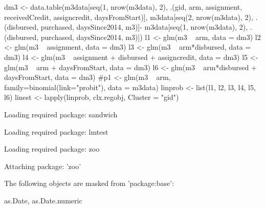 \begin{Schunk}
\begin{Sinput}
dm3 <- data.table(m3data[seq(1, nrow(m3data), 2), 
	.(gid, arm, assignment, receivedCredit, assigncredit, daysFromStart)],
	m3data[seq(2, nrow(m3data), 2), .(disbursed, purchased, daysSince2014, m3)]-
	m3data[seq(1, nrow(m3data), 2), .(disbursed, purchased, daysSince2014, m3)])
l1 <- glm(m3 ~ arm, data = dm3)
l2 <- glm(m3 ~ assignment, data = dm3)
l3 <- glm(m3 ~ arm*disbursed, data = dm3)
l4 <- glm(m3 ~ assignment + disbursed + assigncredit, data = dm3)
l5 <- glm(m3 ~ arm + daysFromStart, data = dm3)
l6 <- glm(m3 ~ arm*disbursed + daysFromStart, data = dm3)
#p1 <- glm(m3 ~ arm, family=binomial(link="probit"), data = m3data)
linprob <- list(l1, l2, l3, l4, l5, l6)
linest <- lapply(linprob, clx.regobj, Cluster = "gid")
\end{Sinput}
\begin{Soutput}
Loading required package: sandwich
\end{Soutput}
\begin{Soutput}
Loading required package: lmtest
\end{Soutput}
\begin{Soutput}
Loading required package: zoo
\end{Soutput}
\begin{Soutput}

Attaching package: 'zoo'
\end{Soutput}
\begin{Soutput}
The following objects are masked from 'package:base':

    as.Date, as.Date.numeric
\end{Soutput}
\end{Schunk}

